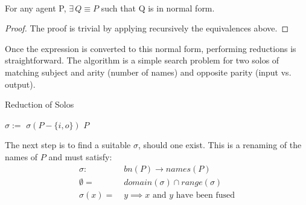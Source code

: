         \begin{lemma}{~\\}
            For any agent P, $\exists \, Q \equiv P$ such that Q is in normal form.
            \begin{proof}
                The proof is trivial by applying recursively the equivalences above.
            \end{proof}
        \end{lemma}

        Once the expression is converted to this normal form, performing reductions is straightforward.
        The algorithm is a simple search problem for two solos of matching subject and arity (number of names) and opposite parity (input vs. output).
        
        \begin{breakablealgorithm}
            \caption{Reduction of Solos}
            \begin{algorithmic}[1]
                     
                         
                             
                                \State$\sigma :=$ 
                                    \State\Return$\sigma(P - \{i, o\})$
                                \EndIf
                            \EndIf
                        \EndFor
                    \EndFor
                    \State\Return$P$
                \EndFunction
            \end{algorithmic}
        \end{breakablealgorithm}

        The next step is to find a suitable $\sigma$, should one exist. This is a renaming of the names of $P$ and must satisfy:
        \begin{align*}
            \sigma : \; & bn(P) \rightarrow names(P) \\
            \emptyset = \; & domain(\sigma) \cap range(\sigma) \\
            \sigma(x) = \; & y \implies \text{$x$ and $y$ have been fused}
        \end{align*}

